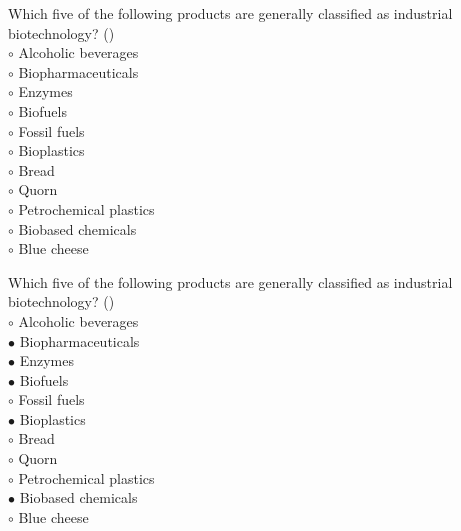 \documentclass[]{beamer}
\begin{document}
\begin{CJK}{UTF8}{gbsn}
\begin{frame}[shrink] {}
\addtocounter{questions}{1}
\color{blue}
Which five of the following products are generally classified as industrial biotechnology?
({})\\
\color{black}
\setlength{\parindent}{-0.4cm}
{\color{red}$\circ$} Alcoholic beverages  \\
{\color{red}$\circ$}  Biopharmaceuticals  \\
{\color{red}$\circ$}  Enzymes   \\
{\color{red}$\circ$}  Biofuels  \\
{\color{red}$\circ$} Fossil fuels  \\
{\color{red}$\circ$}  Bioplastics  \\
{\color{red}$\circ$} Bread  \\
{\color{red}$\circ$} Quorn  \\
{\color{red}$\circ$} Petrochemical plastics  \\
{\color{red}$\circ$}  Biobased chemicals  \\
{\color{red}$\circ$} Blue cheese  \\
\end{frame}
\begin{frame}[shrink] {}
\addtocounter{answers}{1}
\color{blue}
Which five of the following products are generally classified as industrial biotechnology?
({})\\
\color{black}
\setlength{\parindent}{-0.4cm}
{\color{red}$\circ$} Alcoholic beverages  \\
{\color{red}$\bullet$} Biopharmaceuticals  \\
{\color{red}$\bullet$} Enzymes   \\
{\color{red}$\bullet$} Biofuels  \\
{\color{red}$\circ$} Fossil fuels  \\
{\color{red}$\bullet$} Bioplastics  \\
{\color{red}$\circ$} Bread  \\
{\color{red}$\circ$} Quorn  \\
{\color{red}$\circ$} Petrochemical plastics  \\
{\color{red}$\bullet$} Biobased chemicals  \\
{\color{red}$\circ$} Blue cheese  \\
\end{frame}



\end{CJK}
\end{document}
